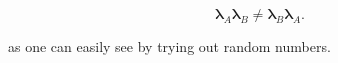 \documentclass[a4paper,12pt]{report}
\begin{document}
\begin{equation}
	\boldsymbol{\lambda } _{A} \boldsymbol{\lambda } _{B} \neq \boldsymbol{\lambda } _{B} \boldsymbol{\lambda } _{A} . 
\end{equation}

as one can easily see by trying out random numbers.
\end{document}
